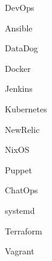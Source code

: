 \begin{skillset}{DevOps}
  \item Ansible
  \item DataDog
  \item Docker
  \item Jenkins
  \item Kubernetes
  \item NewRelic
  \item NixOS
  \item Puppet
  \item ChatOps
  \item systemd
  \item Terraform
  \item Vagrant
\end{skillset}
